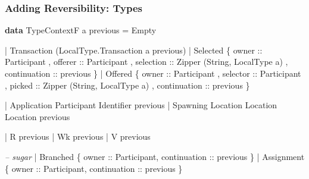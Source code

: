 \documentclass[12pt]{beamer}
\newenvironment{Shaded}{}{}
\newcommand{\KeywordTok}[1]{\textcolor[rgb]{0.00,0.44,0.13}{\textbf{#1}}}
\newcommand{\DataTypeTok}[1]{\textcolor[rgb]{0.56,0.13,0.00}{#1}}
\newcommand{\CommentTok}[1]{\textcolor[rgb]{0.38,0.63,0.69}{\textit{#1}}}
\newcommand{\OtherTok}[1]{\textcolor[rgb]{0.00,0.44,0.13}{#1}}
\newcommand{\FunctionTok}[1]{\textcolor[rgb]{0.02,0.16,0.49}{#1}}
\newcommand{\NormalTok}[1]{#1}
\begin{document}
\begin{frame}[fragile]
\frametitle{Adding Reversibility: Types}

\begin{Shaded}
\begin{Highlighting}[]
\KeywordTok{data} \DataTypeTok{TypeContextF}\NormalTok{ a previous }
    \FunctionTok{=} \DataTypeTok{Empty} 

    \FunctionTok{|} \DataTypeTok{Transaction}\NormalTok{ (}\DataTypeTok{LocalType.Transaction}\NormalTok{ a previous)}
    \FunctionTok{|} \DataTypeTok{Selected} 
\NormalTok{        \{}\OtherTok{ owner ::} \DataTypeTok{Participant}
\NormalTok{        ,}\OtherTok{ offerer ::} \DataTypeTok{Participant} 
\NormalTok{        ,}\OtherTok{ selection ::} \DataTypeTok{Zipper}\NormalTok{ (}\DataTypeTok{String}\NormalTok{, }\DataTypeTok{LocalType}\NormalTok{ a)}
\NormalTok{        ,}\OtherTok{ continuation ::}\NormalTok{ previous }
\NormalTok{        \}}
    \FunctionTok{|} \DataTypeTok{Offered} 
\NormalTok{        \{}\OtherTok{ owner ::} \DataTypeTok{Participant}
\NormalTok{        ,}\OtherTok{ selector ::} \DataTypeTok{Participant} 
\NormalTok{        ,}\OtherTok{ picked ::} \DataTypeTok{Zipper}\NormalTok{ (}\DataTypeTok{String}\NormalTok{, }\DataTypeTok{LocalType}\NormalTok{ a)}
\NormalTok{        ,}\OtherTok{ continuation ::}\NormalTok{ previous }
\NormalTok{        \}}

    \FunctionTok{|} \DataTypeTok{Application} \DataTypeTok{Participant} \DataTypeTok{Identifier}\NormalTok{ previous }
    \FunctionTok{|} \DataTypeTok{Spawning} \DataTypeTok{Location} \DataTypeTok{Location} \DataTypeTok{Location}\NormalTok{ previous}

    \FunctionTok{|} \DataTypeTok{R}\NormalTok{ previous  }
    \FunctionTok{|} \DataTypeTok{Wk}\NormalTok{ previous}
    \FunctionTok{|} \DataTypeTok{V}\NormalTok{ previous}

    \CommentTok{-- sugar}
    \FunctionTok{|} \DataTypeTok{Branched}\NormalTok{ \{}\OtherTok{ owner ::} \DataTypeTok{Participant}\NormalTok{,}\OtherTok{ continuation ::}\NormalTok{ previous \}}
    \FunctionTok{|} \DataTypeTok{Assignment}\NormalTok{ \{}\OtherTok{ owner ::} \DataTypeTok{Participant}\NormalTok{,}\OtherTok{ continuation ::}\NormalTok{ previous \}}
\end{Highlighting}
\end{Shaded}

\end{frame}
\end{document}

